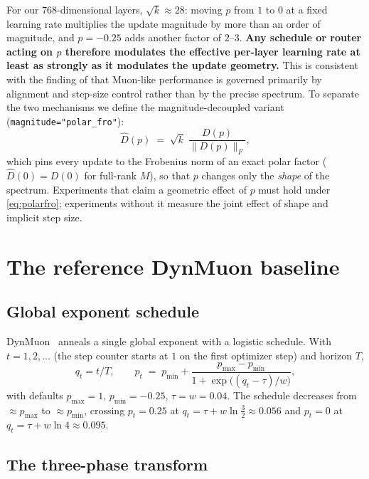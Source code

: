 \documentclass{article}
\begin{document}
For our $768$-dimensional layers, $\sqrt{k} \approx 28$: moving $p$ from $1$
to $0$ at a fixed learning rate multiplies the update magnitude by more than
an order of magnitude, and $p=-0.25$ adds another factor of $2$--$3$.
\textbf{Any schedule or router acting on $p$ therefore modulates the
effective per-layer learning rate at least as strongly as it modulates the
update geometry.} This is consistent with the finding of
\cite{liu2026notspecial} that Muon-like performance is governed primarily by
alignment and step-size control rather than by the precise spectrum. To
separate the two mechanisms we define the magnitude-decoupled variant
(\texttt{magnitude="polar\_fro"}):
\begin{equation}
\label{eq:polarfro}
\widehat{D}(p) \;=\; \sqrt{k}\;\frac{D(p)}{\|D(p)\|_F},
\end{equation}
which pins every update to the Frobenius norm of an exact polar factor
($\widehat D(0) = D(0)$ for full-rank $M$), so that $p$ changes only the
\emph{shape} of the spectrum. Experiments that claim a geometric effect of
$p$ must hold under \eqref{eq:polarfro}; experiments without it measure the
joint effect of shape and implicit step size.

\section{The reference DynMuon baseline}
\label{sec:reference}

\subsection{Global exponent schedule}

DynMuon~\cite{wu2026dynmuon} anneals a single global exponent with a logistic
schedule. With $t = 1, 2, \dots$ (the step counter starts at $1$ on the first
optimizer step) and horizon $T$,
\begin{equation}
\label{eq:schedule}
q_t = t / T, \qquad
p_t \;=\; p_{\min} + \frac{p_{\max} - p_{\min}}
{1 + \exp\!\bigl((q_t - \tau)/w\bigr)},
\end{equation}
with defaults $p_{\max}=1$, $p_{\min}=-0.25$, $\tau = w = 0.04$. The schedule
decreases from $\approx p_{\max}$ to $\approx p_{\min}$, crossing
$p_t = 0.25$ at $q_t = \tau + w \ln\frac{3}{2} \approx 0.056$ and $p_t = 0$
at $q_t = \tau + w \ln 4 \approx 0.095$.

\subsection{The three-phase transform}
\end{document}
